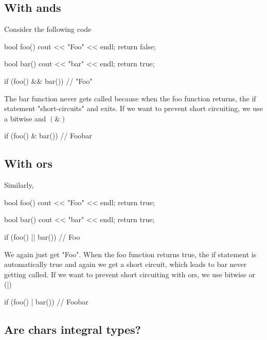 \documentclass{report}
\begin{document}
    \subsection{With ands}
    \bigbreak \noindent 
    Consider the following code
    \bigbreak \noindent 
    \begin{cppcode}
        bool foo() {
            cout << "Foo" << endl;
            return false;
        }

        bool bar() {
            cout << "bar" << endl;
            return true;
        }

        if (foo() && bar()) // "Foo"
    \end{cppcode}
    \bigbreak \noindent 
    The bar function never gets called because when the foo function returns, the if statement "short-circuits" and exits. If we want to prevent short circuiting, we use a bitwise and $(\&)$
    \bigbreak \noindent 
    \begin{cppcode}
    if (foo() & bar()) // Foo\n bar
    \end{cppcode}
    \bigbreak \noindent 
    \subsection{With ors}
    \bigbreak \noindent 
    Similarly, 
    \bigbreak \noindent 
    \begin{cppcode}
        bool foo() {
            cout << "Foo" << endl;
            return true;
        }

        bool bar() {
            cout << "bar" << endl;
            return true;
        }

        if (foo() || bar()) // Foo
    \end{cppcode}
    \bigbreak \noindent 
    We again just get "Foo". When the foo function returns true, the if statement is automatically true and again we get a short circuit, which leads to bar never getting called.  If we want to prevent short circuiting with ors, we use bitwise or (|)
    \bigbreak \noindent 
    \begin{cppcode}
    if (foo() | bar()) // Foo\n bar
    \end{cppcode}

    \pagebreak 
    \bigbreak \noindent 
    \subsection{Are chars integral types?}

    





    
\end{document}
